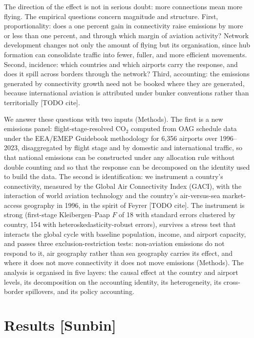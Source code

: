 \documentclass[12pt]{article}
\begin{document}
The direction of the effect is not in serious doubt: more connections mean
more flying. The empirical questions concern magnitude and structure.
First, proportionality: does a one percent gain in connectivity raise
emissions by more or less than one percent, and through which margin of
aviation activity? Network development changes not only the amount of
flying but its organisation, since hub formation can consolidate traffic
into fewer, fuller, and more efficient movements. Second, incidence: which
countries and which airports carry the response, and does it spill across
borders through the network? Third, accounting: the emissions generated by
connectivity growth need not be booked where they are generated, because
international aviation is attributed under bunker conventions rather than
territorially [TODO cite].

We answer these questions with two inputs (Methods). The first is a new
emissions panel: flight-stage-resolved CO$_2$ computed from OAG schedule
data under the EEA/EMEP Guidebook methodology for 6{,}356 airports over
1996--2023, disaggregated by flight stage and by domestic and international
traffic, so that national emissions can be constructed under any allocation
rule without double counting and so that the response can be decomposed on
the identity used to build the data. The second is identification: we
instrument a country's connectivity, measured by the Global Air
Connectivity Index (GACI), with the interaction of world aviation
technology and the country's air-versus-sea market-access geography in
1996, in the spirit of Feyrer [TODO cite]. The instrument is strong
(first-stage Kleibergen--Paap $F$ of 18 with standard errors clustered by
country, 154 with heteroskedasticity-robust errors), survives a stress test that
interacts the global cycle with baseline population, income, and airport
capacity, and passes three exclusion-restriction tests: non-aviation
emissions do not respond to it, air geography rather than sea geography
carries its effect, and where it does not move connectivity it does not
move emissions (Methods). The analysis is
organised in five layers: the causal effect at the country and airport
levels, its decomposition on the accounting identity, its heterogeneity,
its cross-border spillovers, and its policy accounting.

\section*{Results [Sunbin]}
\end{document}
